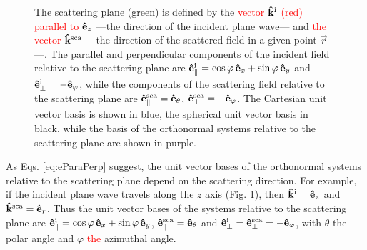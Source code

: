 \begin{figure}[!bht]\centering
	
    \caption[Scattering plane unit vector systems]{The scattering plane (green) is defined by the \textcolor{red}{vector $\vu{k}^\text{i}$ (red) parallel to $\vu{e}_z$} ---the direction of the incident plane wave--- and \textcolor{red}{the vector} $\vu{k}^\text{sca}$ ---the direction of the scattered field in a given point $\vec{r}$---. The parallel and perpendicular components of the incident field relative to the scattering plane are $\vu{e}_\parallel^\text{i} = \cos\varphi\,\vu{e}_x +\sin\varphi\,\vu{e}_y$ and  $\vu{e}_\perp^\text{i} = -\vu{e}_\varphi$, while the components of the scattering field relative to the scattering plane are $\vu{e}_\parallel^\text{sca} = \vu{e}_\theta$, $\vu{e}_\perp^\text{sca} = - \vu{e}_\varphi$. The Cartesian unit vector basis is shown in blue, the spherical unit vector basis in black, while the basis of the orthonormal systems relative to the scattering plane are shown in purple. }
    \label{fig:ScatPlane}
\end{figure}

\noindent
As Eqs. \eqref{eq:eParaPerp} suggest, the unit vector bases of the orthonormal systems relative to the scattering plane depend on the scattering direction. For example, if the incident plane wave travels along the $z$ axis (Fig. \ref{fig:ScatPlane}), then $\vu{k}^\text{i} = \vu{e}_z$ and $\vu{k}^\text{sca} = \vu{e}_r$. Thus the unit vector bases of the systems relative to the scattering plane are   $\vu{e}_\parallel^\text{i} = \cos\varphi\, \vu{e}_x +\sin\varphi\, \vu{e}_y$, $\vu{e}_\parallel^\text{sca} = \vu{e}_\theta$ and $\vu{e}_\perp^\text{i} = \vu{e}_\perp^\text{sca}  = - \vu{e}_\varphi$, with $\theta$ the polar angle and $\varphi$ \textcolor{red}{the} azimuthal angle.

